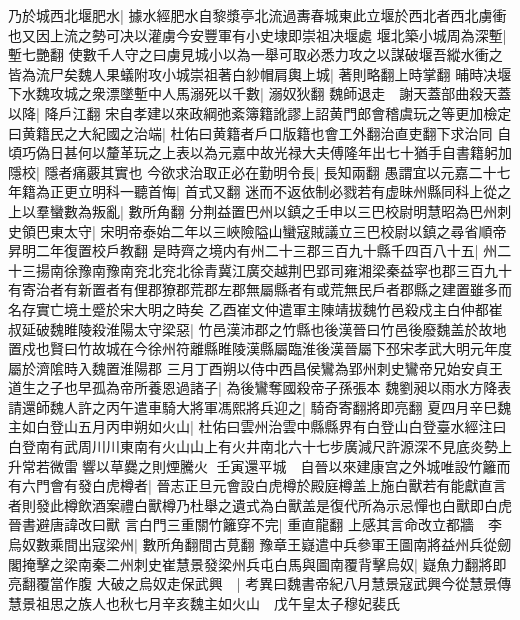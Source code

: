 乃於城西北堰肥水|{
	據水經肥水自黎漿亭北流過夀春城東此立堰於西北者西北虜衝也又因上流之勢可决以灌虜今安豐軍有小史埭即崇祖决堰處}
堰北築小城周為深塹|{
	塹七艷翻}
使數千人守之曰虜見城小以為一舉可取必悉力攻之以謀破堰吾縱水衝之皆為流尸矣魏人果蟻附攻小城崇祖著白紗帽肩輿上城|{
	著則略翻上時掌翻}
晡時决堰下水魏攻城之衆漂墜塹中人馬溺死以千數|{
	溺奴狄翻}
魏師退走　謝天蓋部曲殺天蓋以降|{
	降戶江翻}
宋自孝建以來政綱弛紊簿籍訛謬上詔黄門郎會稽虞玩之等更加檢定曰黄籍民之大紀國之治端|{
	杜佑曰黄籍者戶口版籍也會工外翻治直吏翻下求治同}
自頃巧偽日甚何以釐革玩之上表以為元嘉中故光禄大夫傅隆年出七十猶手自書籍躬加隱校|{
	隱者痛覈其實也}
今欲求治取正必在勤明令長|{
	長知兩翻}
愚謂宜以元嘉二十七年籍為正更立明科一聽首悔|{
	首式又翻}
迷而不返依制必戮若有虚昧州縣同科上從之　上以羣蠻數為叛亂|{
	數所角翻}
分荆益置巴州以鎮之壬申以三巴校尉明慧昭為巴州刺史領巴東太守|{
	宋明帝泰始二年以三峽險隘山蠻寇賊議立三巴校尉以鎮之尋省順帝昇明二年復置校戶教翻}
是時齊之境内有州二十三郡三百九十縣千四百八十五|{
	州二十三揚南徐豫南豫南兖北兖北徐青冀江廣交越荆巴郢司雍湘梁秦益寜也郡三百九十有寄治者有新置者有俚郡獠郡荒郡左郡無屬縣者有或荒無民戶者郡縣之建置雖多而名存實亡境土蹙於宋大明之時矣}
乙酉崔文仲遣軍主陳靖拔魏竹邑殺戍主白仲都崔叔延破魏睢陵殺淮陽太守梁惡|{
	竹邑漢沛郡之竹縣也後漢晉曰竹邑後廢魏盖於故地置戍也賢曰竹故城在今徐州符離縣睢陵漢縣屬臨淮後漢晉屬下邳宋孝武大明元年度屬於濟隂時入魏置淮陽郡}
三月丁酉朔以侍中西昌侯鸞為郢州刺史鸞帝兄始安貞王道生之子也早孤為帝所養恩過諸子|{
	為後鸞奪國殺帝子孫張本}
魏劉昶以雨水方降表請還師魏人許之丙午遣車騎大將軍馮熙將兵迎之|{
	騎奇寄翻將即亮翻}
夏四月辛巳魏主如白登山五月丙申朔如火山|{
	杜佑曰雲州治雲中縣縣界有白登山白登臺水經注曰白登南有武周川川東南有火山山上有火井南北六十七步廣減尺許源深不見底炎勢上升常若微雷響以草爨之則煙騰火}
壬寅還平城　自晉以來建康宫之外城唯設竹籬而有六門會有發白虎樽者|{
	晉志正旦元會設白虎樽於殿庭樽盖上施白獸若有能獻直言者則發此樽飲酒案禮白獸樽乃杜舉之遺式為白獸盖是復代所為示忌憚也白獸即白虎晉書避唐諱改曰獸}
言白門三重關竹籬穿不完|{
	重直龍翻}
上感其言命改立都牆　李烏奴數乘間出寇梁州|{
	數所角翻間古莧翻}
豫章王嶷遣中兵參軍王圖南將益州兵從劒閣掩擊之梁南秦二州刺史崔慧景發梁州兵屯白馬與圖南覆背擊烏奴|{
	嶷魚力翻將即亮翻覆當作腹}
大破之烏奴走保武興　|{
	考異曰魏書帝紀八月慧景寇武興今從慧景傳}
慧景祖思之族人也秋七月辛亥魏主如火山　戊午皇太子穆妃裴氏

